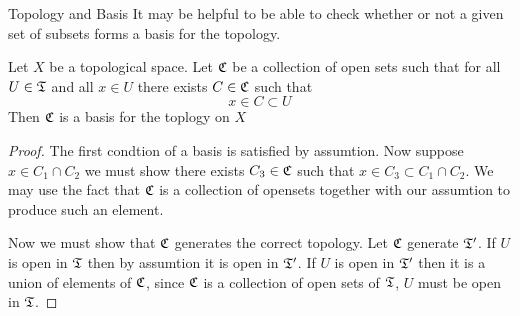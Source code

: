 \begin{chapter}{Topology and Basis}
    It may be helpful to be able to check whether or not a given set of subsets forms a basis for the topology. 
    
    \begin{lem}
        Let $X$ be a topological space. Let $\mathfrak{C}$ be a collection of open sets such that 
        for all $U \in \mathfrak{T}$ and all $x \in U$ there exists $C \in \mathfrak{C}$ such that 
        \[x \in C \subset U\]
        Then $\mathfrak{C}$ is a basis for the toplogy on $X$
    \end{lem}

    
    \begin{proof}
        The first condtion of a basis is satisfied by assumtion. Now suppose $x \in C_1 \cap C_2$ we must show there exists 
        $C_3 \in \mathfrak{C}$ such that $x \in C_3 \subset C_1 \cap C_2$. We may use the fact that $\mathfrak{C}$ is a collection of opensets together with our assumtion 
        to produce such an element. 

        Now we must show that $\mathfrak{C}$ generates the correct topology. Let $\mathfrak{C}$ generate $\mathfrak{T}^\prime$. If $U$ is open in $\mathfrak{T}$ then by assumtion it is open in $\mathfrak{T}^\prime$. 
        If $U$ is open in $\mathfrak{T}^\prime$ then it is a union of elements of $\mathfrak{C}$, since $\mathfrak{C}$ is a collection of open sets of $\mathfrak{T}$, $U$ must be open in $\mathfrak{T}$.
    \end{proof}

    

\end{chapter}
